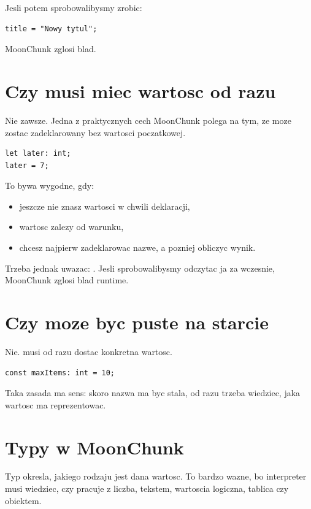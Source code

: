 Jesli potem sprobowalibysmy zrobic:

\begin{lstlisting}[style=moonchunk,caption={Niedozwolona zmiana wartosci stalej}]
title = "Nowy tytul";
\end{lstlisting}

MoonChunk zglosi blad.

\section{Czy  musi miec wartosc od razu}
Nie zawsze. Jedna z praktycznych cech MoonChunk polega na tym, ze  moze
zostac zadeklarowany bez wartosci poczatkowej.

\begin{lstlisting}[style=moonchunk,caption={Deklaracja let bez inicjalizacji}]
let later: int;
later = 7;
\end{lstlisting}

To bywa wygodne, gdy:

\begin{itemize}
  \item jeszcze nie znasz wartosci w chwili deklaracji,
  \item wartosc zalezy od warunku,
  \item chcesz najpierw zadeklarowac nazwe, a pozniej obliczyc wynik.
\end{itemize}

Trzeba jednak uwazac: .
Jesli sprobowalibysmy odczytac ja za wczesnie, MoonChunk zglosi blad runtime.

\section{Czy  moze byc puste na starcie}
Nie.  musi od razu dostac konkretna wartosc.

\begin{lstlisting}[style=moonchunk,caption={Poprawna deklaracja const}]
const maxItems: int = 10;
\end{lstlisting}

Taka zasada ma sens: skoro nazwa ma byc stala, od razu trzeba wiedziec, jaka wartosc
ma reprezentowac.

\section{Typy w MoonChunk}
Typ okresla, jakiego rodzaju jest dana wartosc. To bardzo wazne, bo interpreter
musi wiedziec, czy pracuje z liczba, tekstem, wartoscia logiczna, tablica czy obiektem.

